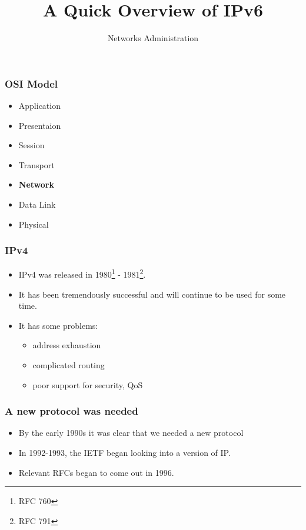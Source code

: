 \documentclass[10pt]{beamer}
\title{A Quick Overview of IPv6}
\author[IN715]{Networks Administration}
\institute[Otago Polytechnic]{
  Otago Polytechnic \\
  Dunedin, New Zealand \\
}
\date{}
\begin{document}
\begin{frame}[plain]
  \titlepage
\end{frame}



\begin{frame}
  \frametitle{OSI Model}

 \begin{itemize}
  \item Application
  \item Presentaion
  \item Session
  \item Transport
  \item \textbf{Network}
  \item Data Link
  \item Physical
 \end{itemize}

\end{frame}

\begin{frame}
  \frametitle{IPv4}

 \begin{itemize}
  \item IPv4 was released in 1980\footnote{RFC 760} - 1981\footnote{RFC 791}.
  \item It has been tremendously successful and will continue to be used for some time.
  \item It has some problems:
    \begin{itemize}
      \item address exhaustion
      \item complicated routing
      \item poor support for security, QoS
    \end{itemize}
 \end{itemize}

\end{frame}


\begin{frame}
  \frametitle{A new protocol was needed}

 \begin{itemize}
  \item By the early 1990s it was clear that we needed a new protocol
  \item In 1992-1993, the IETF began looking into a version of IP.
  \item Relevant RFCs began to come out in 1996.
 \end{itemize}

\end{frame}
\end{document}
